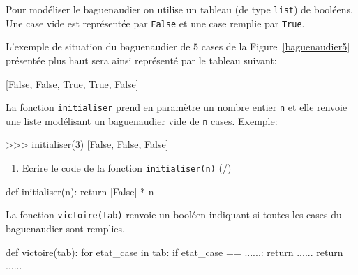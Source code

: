 Pour modéliser le baguenaudier on utilise un tableau (de type \verb|list|) de booléens. Une case vide est représentée par \texttt{False} et une case remplie par \texttt{True}.



 L'exemple de situation du baguenaudier de $5$ cases de la Figure~\ref{baguenaudier5} présentée plus haut sera ainsi représenté par le tableau suivant: 

    \begin{CodePythontexAlt}[TaillePolice=\large, Largeur=1\linewidth,Centre,Lignes=true,PremLigne=1]{}
[False, False, True, True, False]
\end{CodePythontexAlt}

 La fonction \texttt{initialiser} prend en paramètre un nombre entier \texttt{n} et elle renvoie une liste modélisant un baguenaudier vide de \texttt{n} cases. Exemple:

    \begin{CodePythontexAlt}[TaillePolice=\large, Largeur=1\linewidth,Centre,Lignes=true,PremLigne=1]{}
    >>> initialiser(3)
    [False, False, False]
\end{CodePythontexAlt}

\pagebreak

\begin{enumerate}[resume=monDS]
\item Ecrire le code de la fonction \texttt{initialiser(n)} (/)
\end{enumerate}

\begin{blocvisible}[height=3.5]
    \begin{CodePythontexAlt}[TaillePolice=\large, Largeur=1\linewidth,Centre,Lignes=true,PremLigne=1]{}
    def initialiser(n):
        return [False] * n
    \end{CodePythontexAlt}
\end{blocvisible}

\medskip

 La fonction \texttt{victoire(tab)} renvoie un booléen indiquant si toutes les cases du baguenaudier sont remplies.

    \begin{CodePythontexAlt}[TaillePolice=\large, Largeur=1\linewidth,Centre,Lignes=true,PremLigne=1]{}
def victoire(tab):
    for etat_case in tab:
        if etat_case == ......:
            return ......
    return ......

    \end{CodePythontexAlt}


